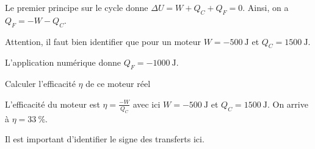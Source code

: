 \reponse{\reponseA{}}

\begin{corrige}
Le premier principe sur le cycle donne $\Delta U=W+Q_C+Q_F=0$. Ainsi, on a $Q_F=-W-Q_C$.

Attention, il faut bien identifier que pour un moteur $W=\SI{-500}{\joule}$ et $Q_C=\SI{+1500}{\joule}$. 

L'application numérique donne $Q_F=\SI{-1000}{\joule}$.
\end{corrige}




\begin{enonce}
	Calculer l'efficacité $\eta$ de ce moteur réel
\end{enonce}


\begin{corrige}
L'efficacité du moteur est $\eta=\frac{-W}{Q_C}$ avec ici $W=\SI{-500}{\joule}$ et $Q_C=\SI{+1500}{\joule}$. On arrive à $\eta=\SI{33}{\%}$. 

Il est important d'identifier le signe des transferts ici.
\end{corrige}


\finEntrainement








\hauteurLargeurCadreReponse		{7mm}{4.5cm}
\typeEntrainement				{} %
\initialisationEntrainement

